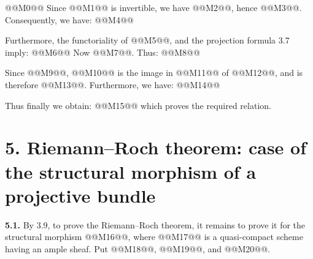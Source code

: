 @@M0@@
Since @@M1@@ is invertible, we have @@M2@@, hence @@M3@@.
Consequently, we have:
@@M4@@

Furthermore, the functoriality of @@M5@@, and the projection formula 3.7 imply:
@@M6@@
Now @@M7@@. Thus:
@@M8@@

Since @@M9@@, @@M10@@ is the image in @@M11@@ of @@M12@@, and is therefore @@M13@@. Furthermore, we have:
@@M14@@

Thus finally we obtain:
@@M15@@
which proves the required relation.

\section*{5. Riemann--Roch theorem: case of the structural morphism of a projective bundle}

\textbf{5.1.} By 3.9, to prove the Riemann--Roch theorem, it remains to prove it for the structural morphism @@M16@@, where @@M17@@ is a quasi-compact scheme having an ample sheaf. Put @@M18@@, @@M19@@, and @@M20@@.
